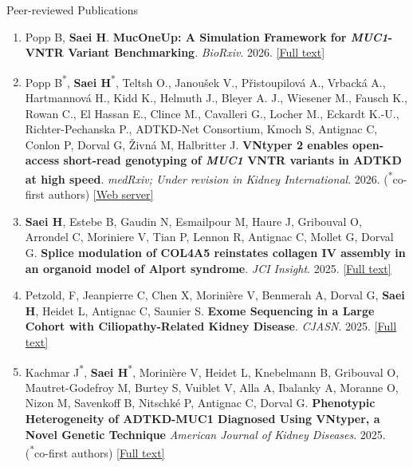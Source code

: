 \documentclass[
	11pt, %
]{resume} %
\begin{document}
\begin{rSection}{Peer-reviewed Publications}

\begin{enumerate}
  \item  Popp B, \textbf{Saei H}.
  \textbf{MucOneUp: A Simulation Framework for \textit{MUC1}-VNTR Variant Benchmarking}. 
  \textit{BioRxiv}. 2026. \href{https://www.biorxiv.org/content/10.64898/2026.05.08.723876v1}{[Full text]}

  \item Popp B\textsuperscript{*}, \textbf{Saei H}\textsuperscript{*}, Teltsh O., Janoušek V., Přistoupilová A., Vrbacká A., Hartmannová H., Kidd K., Helmuth J., Bleyer A. J., Wiesener M., Fausch K., Rowan C., El Hassan E., Clince M., Cavalleri G., Locher M., Eckardt K.-U., Richter-Pechanska P., ADTKD-Net Consortium, Kmoch S, Antignac C, Conlon P, Dorval G, Živná M, Halbritter J.
  \textbf{VNtyper 2 enables open-access short-read genotyping of \textit{MUC1} VNTR variants in ADTKD at high speed}.  
  \textit{medRxiv; Under revision in Kidney International}. 2026. (\textsuperscript{*}co-first authors) \href{https://vntyper.org/}{[Web server]}
  
  \item \textbf{Saei H},  Estebe B, Gaudin N, Esmailpour M, Haure J,  Gribouval O,  Arrondel C,  Moriniere V,  Tian P,  Lennon R,  Antignac C,  Mollet G, Dorval G. 
  \textbf{Splice modulation of COL4A5 reinstates collagen IV assembly in an organoid model of Alport syndrome}. 
  \textit{JCI Insight}. 2025. \href{https://insight.jci.org/articles/view/194759}{[Full text]}
  
    \item Petzold, F, Jeanpierre C, Chen X, Morinière V, Benmerah A, Dorval G, \textbf{Saei H}, Heidet L, Antignac C, Saunier S.
  \textbf{Exome Sequencing in a Large Cohort with Ciliopathy-Related Kidney Disease}.
  \textit{CJASN}. 2025. \href{https://journals.lww.com/cjasn/abstract/9900/exome_sequencing_in_a_large_cohort_with.802.aspx}{[Full text]}
  
    \item Kachmar J\textsuperscript{*}, \textbf{Saei H}\textsuperscript{*}, Morinière V, Heidet L, Knebelmann B, Gribouval O, Mautret-Godefroy M, Burtey S, Vuiblet V,  Alla A, Ibalanky A, Moranne O, Nizon M, Savenkoff B, Nitschké P, Antignac C, Dorval G.
   \textbf{Phenotypic Heterogeneity of ADTKD-MUC1 Diagnosed Using VNtyper, a Novel Genetic Technique}
  \textit{American Journal of Kidney Diseases}. 2025. (\textsuperscript{*}co-first authors) \href{https://www.ajkd.org/article/S0272-6386(25)00038-1/abstract}{[Full text]}
  

\end{enumerate}
\end{rSection}
\end{document}

